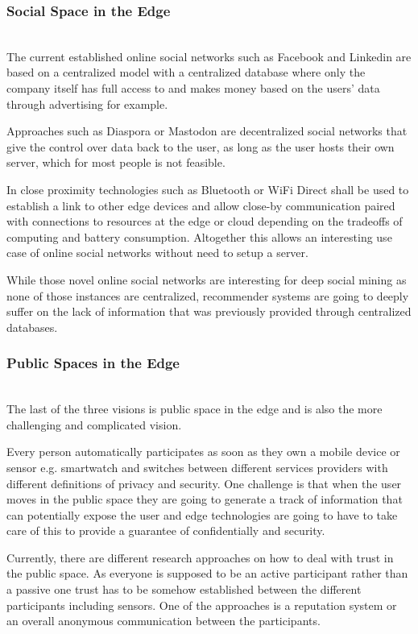 \subsubsection{Social Space in the Edge}\hspace*{\fill} \\
The current established online social networks such as Facebook and Linkedin are based on a centralized model with a centralized database where only the company itself has full access to and makes money based on the users’ data through advertising for example.

Approaches such as Diaspora or Mastodon are decentralized social networks that give the control over data back to the user, as long as the user hosts their own server, which for most people is not feasible.

In close proximity technologies such as Bluetooth or WiFi Direct shall be used to establish a link to other edge devices and allow close-by communication paired with connections to resources at the edge or cloud depending on the tradeoffs of computing and battery consumption. Altogether this allows an interesting use case of online social networks without need to setup a server.

While those novel online social networks are interesting for deep social mining as none of those instances are centralized, recommender systems are going to deeply suffer on the lack of information that was previously provided through centralized databases.

\subsubsection{Public Spaces in the Edge}\hspace*{\fill} \\
The last of the three visions is public space in the edge and is also the more challenging and complicated vision.

Every person automatically participates as soon as they own a mobile device or sensor e.g. smartwatch and switches between different services providers with different definitions of privacy and security.
One challenge is that when the user moves in the public space they are going to generate a track of information that can potentially expose the user and edge technologies are going to have to take care of this to provide a guarantee of confidentially and security.

Currently, there are different research approaches on how to deal with trust in the public space. As everyone is supposed to be an active participant rather than a passive one trust has to be somehow established between the different participants including sensors.
One of the approaches is a reputation system or an overall anonymous communication between the participants.

